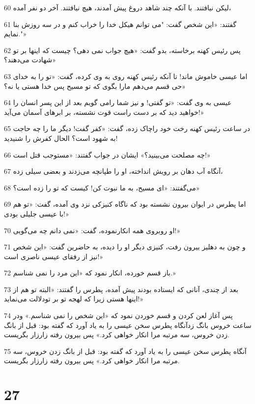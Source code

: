 \par 60 لیکن نیافتند. با آنکه چند شاهد دروغ پیش آمدند، هیچ نیافتند. آخر دو نفر آمده،
\par 61 گفتند: «این شخص گفت: "می توانم هیکل خدا را خراب کنم و در سه روزش بنا نمایم."»
\par 62 پس رئیس کهنه برخاسته، بدو گفت: «هیچ جواب نمی دهی؟ چیست که اینها بر تو شهادت می‌دهند؟»
\par 63 اما عیسی خاموش ماند! تا آنکه رئیس کهنه روی به وی کرده، گفت: «تو را به خدای حی قسم می‌دهم مارا بگوی که تو مسیح پس خدا هستی یا نه؟»
\par 64 عیسی به وی گفت: «تو گفتی! و نیز شما رامی گویم بعد از این پسر انسان را خواهید دید که بر دست راست قوت نشسته، بر ابرهای آسمان می‌آید!»
\par 65 در ساعت رئیس کهنه رخت خود راچاک زده، گفت: «کفر گفت! دیگر ما را چه حاجت به شهود است؟ الحال کفرش را شنیدید!
\par 66 چه مصلحت می‌بینید؟» ایشان در جواب گفتند: «مستوجب قتل است!»
\par 67 آنگاه آب دهان بر رویش انداخته، او را طپانچه می‌زدند و بعضی سیلی زده،
\par 68 می‌گفتند: «ای مسیح، به ما نبوت کن! کیست که تو را زده است؟»
\par 69 اما پطرس در ایوان بیرون نشسته بود که ناگاه کنیزکی نزد وی آمده، گفت: «تو هم با عیسی جلیلی بودی!»
\par 70 او روبروی همه انکارنموده، گفت: «نمی دانم چه می‌گویی!»
\par 71 و چون به دهلیز بیرون رفت، کنیزی دیگر او را دیده، به حاضرین گفت: «این شخص نیز از رفقای عیسی ناصری است!»
\par 72 باز قسم خورده، انکار نمود که «این مرد را نمی شناسم.»
\par 73 بعد از چندی، آنانی که ایستاده بودند پیش آمده، پطرس را گفتند: «البته تو هم از اینها هستی زیرا که لهجه تو بر تودلالت می‌نماید!»
\par 74 پس آغاز لعن کردن و قسم خوردن نمود که «این شخص را نمی شناسم.» ودر ساعت خروس بانگ زدآنگاه پطرس سخن عیسی را به یاد آورد که گفته بود: قبل از بانگ زدن خروس، سه مرتبه مرا انکار خواهی کرد.» پس بیرون رفته زار‌زار بگریست.
\par 75 آنگاه پطرس سخن عیسی را به یاد آورد که گفته بود: قبل از بانگ زدن خروس، سه مرتبه مرا انکار خواهی کرد.» پس بیرون رفته زار‌زار بگریست.

\chapter{27}

